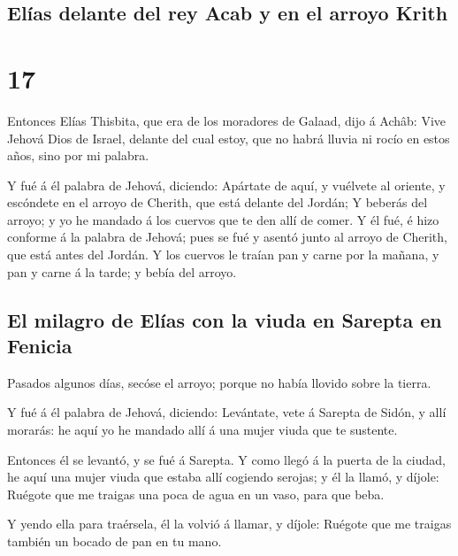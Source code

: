 \hypertarget{eluxedas-delante-del-rey-acab-y-en-el-arroyo-krith}{%
\subsection{Elías delante del rey Acab y en el arroyo
Krith}\label{eluxedas-delante-del-rey-acab-y-en-el-arroyo-krith}}

\hypertarget{section-11-17}{%
\section{17}\label{section-11-17}}

 Entonces Elías Thisbita, que era de los moradores de
Galaad, dijo á Achâb: Vive Jehová Dios de Israel, delante del cual
estoy, que no habrá lluvia ni rocío en estos años, sino por mi palabra.

 Y fué á él palabra de Jehová, diciendo: 
Apártate de aquí, y vuélvete al oriente, y escóndete en el arroyo de
Cherith, que está delante del Jordán;  Y beberás del
arroyo; y yo he mandado á los cuervos que te den allí de comer.
 Y él fué, é hizo conforme á la palabra de Jehová; pues se
fué y asentó junto al arroyo de Cherith, que está antes del Jordán.
 Y los cuervos le traían pan y carne por la mañana, y pan
y carne á la tarde; y bebía del arroyo.

\hypertarget{el-milagro-de-eluxedas-con-la-viuda-en-sarepta-en-fenicia}{%
\subsection{El milagro de Elías con la viuda en Sarepta en
Fenicia}\label{el-milagro-de-eluxedas-con-la-viuda-en-sarepta-en-fenicia}}

 Pasados algunos días, secóse el arroyo; porque no había
llovido sobre la tierra.

 Y fué á él palabra de Jehová, diciendo: 
Levántate, vete á Sarepta de Sidón, y allí morarás: he aquí yo he
mandado allí á una mujer viuda que te sustente.

 Entonces él se levantó, y se fué á Sarepta. Y como llegó
á la puerta de la ciudad, he aquí una mujer viuda que estaba allí
cogiendo serojas; y él la llamó, y díjole: Ruégote que me traigas una
poca de agua en un vaso, para que beba.

 Y yendo ella para traérsela, él la volvió á llamar, y
díjole: Ruégote que me traigas también un bocado de pan en tu mano.

